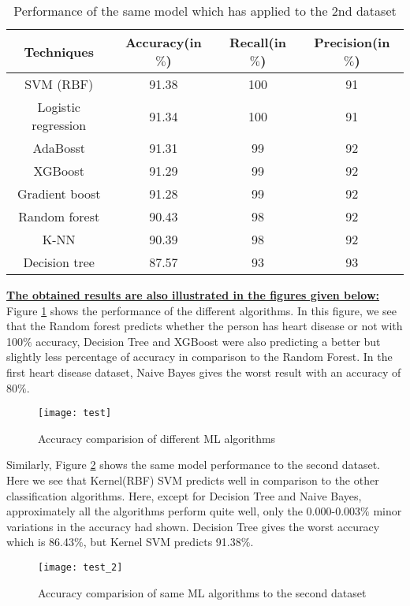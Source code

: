 \documentclass[11pt]{article}
\begin{document}
\begin{table}[H]
\centering
\caption{ Performance of the same model which has applied to the 2nd dataset}
\vspace{0.3cm}
\def\arraystretch{0.9}
\begin{tabular}{|c|c|c|c|}
\hline
Techniques      &    Accuracy(in $\%$) &  Recall(in $\%$)           &   Precision(in $\%$)  \\ \hline
SVM (RBF)	     &     91.38        &  100			&    91   \\ 
Logistic regression &    91.34		&   100         &      91\\ 
AdaBosst          &      91.31      &   99           &      92\\    
XGBoost          &       91.29      &  99          &       92\\
Gradient boost    &     91.28       &  99           &      92 \\ 
Random forest   &     90.43			&  98		   &    92\\
K-NN 		  &         90.39       &   98		   &     92\\
Decision tree  &       87.57			&  93		   &     93\\
   \hline

\end{tabular}
\label{tab:data5}
\end{table}
\underline{\textbf{The obtained results are also illustrated in the figures given below:}}\\
Figure \ref{fig:fig1} shows the performance of the different algorithms. In this figure, we see that the Random forest predicts whether the person has heart disease or not with 100$\%$ accuracy, Decision Tree and XGBoost were also predicting a better but slightly less percentage of accuracy in comparison to the Random Forest. In the first heart disease dataset, Naive Bayes gives the worst result with an accuracy of 80$\%$.
\vspace{-0.5cm}
\begin{figure}[H]
\centering
\texttt{[image: test]}
\caption{Accuracy comparision of different ML algorithms }
\label{fig:fig1}
\end{figure}

Similarly, Figure  \ref{fig:fiig22} shows the same model performance to the second dataset. Here we see that Kernel(RBF) SVM predicts well in comparison to the other classification algorithms. Here, except for Decision Tree and Naive Bayes, approximately all the algorithms perform quite well, only the 0.000-0.003$\%$ minor variations in the accuracy had shown. Decision Tree gives the worst accuracy which is 86.43$\%$, but Kernel SVM predicts 91.38$\%$.\\
\begin{figure}[H]
\centering
\texttt{[image: test\_2]}
\caption{Accuracy comparision of same ML algorithms to the second dataset }
\label{fig:fiig22}
\end{figure}
\end{document}
